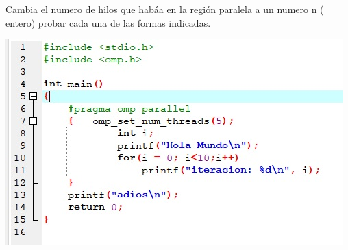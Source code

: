 \documentclass[12pt,letterpaper]{article}
\begin{document}
Cambia el numero de hilos que habáa en la región paralela a un numero n ( entero) probar cada una de las formas indicadas.
\begin{flushleft}
\includegraphics[scale=.8]{ejercicio2.jpg} 

\end{flushleft}
\end{document}
